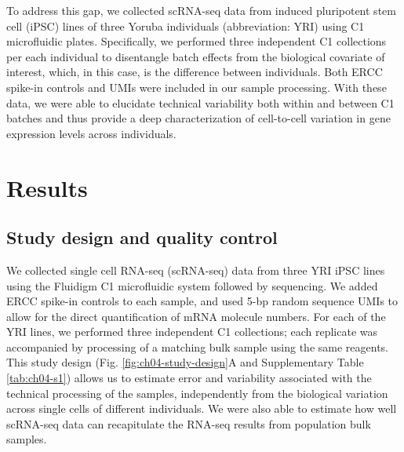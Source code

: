 To address this gap, we collected scRNA-seq data from induced
pluripotent stem cell (iPSC) lines of three Yoruba individuals
(abbreviation: YRI) using C1 microfluidic plates. Specifically, we
performed three independent C1 collections per each individual to
disentangle batch effects from the biological covariate of interest,
which, in this case, is the difference between individuals. Both ERCC
spike-in controls and UMIs were included in our sample processing. With
these data, we were able to elucidate technical variability both within
and between C1 batches and thus provide a deep characterization of
cell-to-cell variation in gene expression levels across individuals.

\section{Results}\label{ch04-results}

\subsection{Study design and quality
control}\label{study-design-and-quality-control}

We collected single cell RNA-seq (scRNA-seq) data from three YRI iPSC
lines using the Fluidigm C1 microfluidic system followed by sequencing.
We added ERCC spike-in controls to each sample, and used 5-bp random
sequence UMIs to allow for the direct quantification of mRNA molecule
numbers. For each of the YRI lines, we performed three independent C1
collections; each replicate was accompanied by processing of a matching
bulk sample using the same reagents. This study design (Fig. \ref{fig:ch04-study-design}A and
Supplementary Table \ref{tab:ch04-s1}) allows us to estimate error and variability
associated with the technical processing of the samples, independently
from the biological variation across single cells of different
individuals. We were also able to estimate how well scRNA-seq data can
recapitulate the RNA-seq results from population bulk samples.

